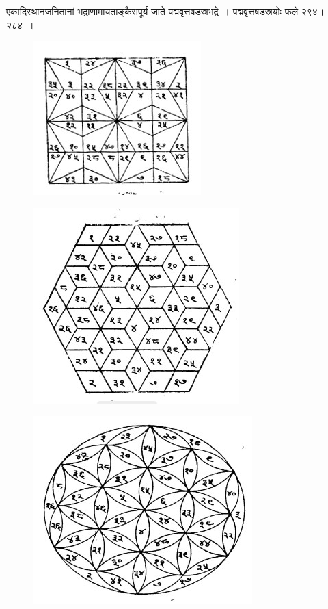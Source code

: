 \documentclass[11pt, openany]{book}
\begin{document}
\newpage

एकादिस्थानजनितानां भद्राणामायताङ्कैरापूर्य जाते पद्मवृत्तषडस्रभद्रे~। पद्मवृत्तषडस्रयोः फले २९४।२८४~।

\begin{figure}[h!]
    \centering
    \includegraphics[scale=0.7]{graphics/421_1.jpg}
\end{figure}
\vspace{-4mm}

\begin{figure}[h!]
    \centering
    \includegraphics[scale=0.7]{graphics/421_2.jpg}
    
\end{figure}

\newpage

\begin{figure}[h!]
    \centering
    \includegraphics[scale=0.65]{graphics/422.jpg}
    
\end{figure}
\end{document}
